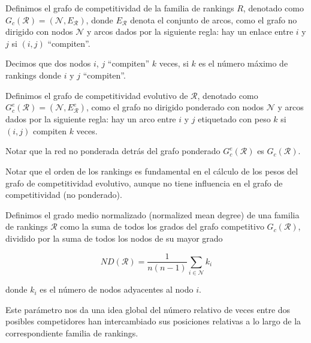 \begin{defi}
Definimos el grafo de competitividad de la familia de rankings $R$, denotado como $G_c(\mathcal{R}) = (\mathcal{N}, E_\mathcal{R})$, donde $E_\mathcal{R}$ denota el conjunto de arcos, como el grafo no dirigido con nodos $\mathcal{N}$ y arcos dados por la siguiente regla: hay un enlace entre $i$ y $j$ si $(i,j)$ ``compiten''.
\end{defi}

\begin{defi}
Decimos que dos nodos $i$, $j$ ``compiten'' $k$ veces, si $k$ es el número máximo de rankings donde $i$ y $j$ ``compiten''.
\end{defi}

\begin{defi}
Definimos el grafo de competitividad evolutivo de $\mathcal{R}$, denotado como $G_c^e(\mathcal{R}) = (\mathcal{N}, E_\mathcal{R}^e)$, como el grafo no dirigido ponderado con nodos $\mathcal{N}$ y arcos dados por la siguiente regla: hay un arco entre $i$ y $j$ etiquetado con peso $k$ si $(i,j)$ compiten $k$ veces.
\end{defi}

\begin{nota}
Notar que la red no ponderada detrás del grafo ponderado $G_c^e(\mathcal{R})$ es $G_c(\mathcal{R})$.
\end{nota}

\begin{nota}
Notar que el orden de los rankings es fundamental en el cálculo de los pesos del grafo de competitividad evolutivo, aunque no tiene influencia en el grafo de competitividad (no ponderado).
\end{nota}

\begin{defi}
Definimos el grado medio normalizado (normalized mean degree) de una familia de rankings $\mathcal{R}$ como la suma de todos los grados del grafo competitivo $G_c(\mathcal{R})$, dividido por la suma de todos los nodos de su mayor grado

\[ND(\mathcal{R}) = \dfrac{1}{n(n-1)} \sum_{i \in \mathcal{N}} k_i\]

donde $k_i$ es el número de nodos adyacentes al nodo $i$.
\end{defi}

\begin{ob}
Este parámetro nos da una idea global del número relativo de veces entre dos posibles competidores han intercambiado sus posiciones relativas a lo largo de la correspondiente familia de rankings.
\end{ob}

